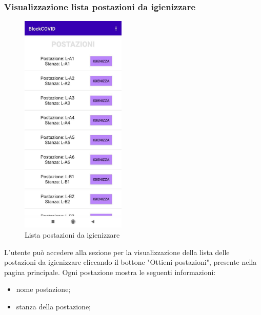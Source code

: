 	\subsubsection{Visualizzazione lista postazioni da igienizzare}
	\begin{figure}[H]
		\centering
		\includegraphics[width=5cm]{res/images/postazioniDaIgienizzareAddetto.png}
		\caption{Lista postazioni da igienizzare}
	\end{figure}	
	L’utente può accedere alla sezione per la visualizzazione della lista delle postazioni da igienizzare cliccando il bottone "Ottieni postazioni", presente nella pagina principale.
	Ogni postazione mostra le seguenti informazioni:
	\begin{itemize}
		\item nome postazione;
		\item stanza della postazione;
	\end{itemize}
